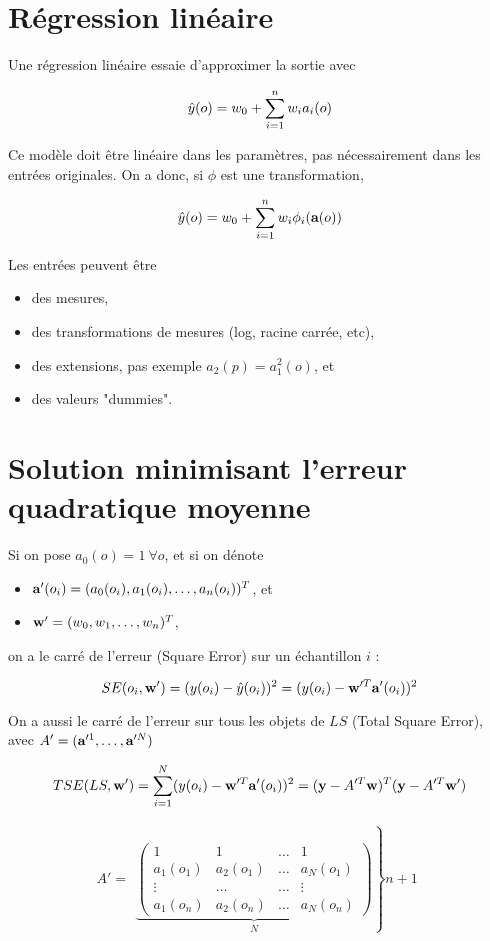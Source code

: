	\section{Régression linéaire}
	
	Une régression linéaire essaie d'approximer la sortie avec
	
	$$\hat{y}(o) = w_0 + \sum_{i = 1}^n w_i a_i(o)$$
	
	Ce modèle doit être linéaire dans les paramètres, pas nécessairement dans les entrées originales. On a donc, si $\phi$ est une transformation,
	
	$$\hat{y}(o) = w_0 + \sum_{i = 1}^n w_i \phi_i(\textbf{a}(o))$$
	
	Les entrées peuvent être
	
	\begin{itemize}
		\item des mesures,
		\item des transformations de mesures (log, racine carrée, etc),
		\item des extensions, pas exemple $a_2(p) = a^2_1(o)$, et
		\item des valeurs "dummies".
	\end{itemize}
	
	\section{Solution minimisant l'erreur quadratique moyenne}
	
	Si on pose $a_0(o) = 1 \: \forall o$, et si on dénote
	
	
	\begin{itemize}
		\item $\textbf{a}'(o_i) = (a_0(o_i), a_1(o_i), \dots , a_n(o_i))^T$, et
		\item $\textbf{w}' = (w_0, w_1, \dots , w_n)^T$,
	\end{itemize}
	
	on a le carré de l'erreur (Square Error) sur un échantillon $i$ :
	
	$$SE(o_i, \textbf{w}') = (y(o_i) - \hat{y}(o_i))^2 = (y(o_i) - \textbf{w}'^T\textbf{a}'(o_i))^2$$
	
	On a aussi le carré de l'erreur sur tous les objets de $LS$ (Total Square Error), avec $A' = (\textbf{a}'^1, \dots , \textbf{a}'^N)$
	
	$$TSE(LS, \textbf{w}') = \sum_{i = 1}^N (y(o_i) - \textbf{w}'^T\textbf{a}'(o_i))^2 = (\textbf{y} - A'^T\textbf{w})^T(\textbf{y} - A'^T\textbf{w}')$$
	
	$$A' = \begin{array}{c}\left. \underbrace{\begin{pmatrix}
	1 & 1 & \dots & 1 \\ 
	a_1(o_1) & a_2(o_1) & \dots & a_N(o_1) \\ 
	\vdots & \dots & \dots & \vdots \\ 
	a_1(o_n) & a_2(o_n) & \dots & a_N(o_n)
	\end{pmatrix}}_{N}\right\} n + 1\end{array} $$
	
